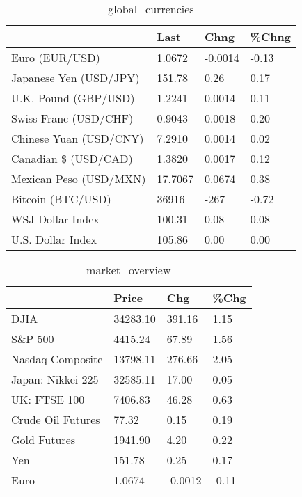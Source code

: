\documentclass{article}%
\begin{document}
%


\begin{table}[htbp]%
\caption{global\_currencies}%
\centering%
\begin{adjustbox}{width=1\textwidth}%
\begin{tabular}{llll}
\toprule
                       &    Last &    Chng & \%Chng \\
\midrule
        Euro (EUR/USD) &  1.0672 & -0.0014 & -0.13 \\
Japanese Yen (USD/JPY) &  151.78 &    0.26 &  0.17 \\
  U.K. Pound (GBP/USD) &  1.2241 &  0.0014 &  0.11 \\
 Swiss Franc (USD/CHF) &  0.9043 &  0.0018 &  0.20 \\
Chinese Yuan (USD/CNY) &  7.2910 &  0.0014 &  0.02 \\
  Canadian \$ (USD/CAD) &  1.3820 &  0.0017 &  0.12 \\
Mexican Peso (USD/MXN) & 17.7067 &  0.0674 &  0.38 \\
     Bitcoin (BTC/USD) &   36916 &    -267 & -0.72 \\
      WSJ Dollar Index &  100.31 &    0.08 &  0.08 \\
     U.S. Dollar Index &  105.86 &    0.00 &  0.00 \\
\bottomrule
\end{tabular}
%
\end{adjustbox}%
\end{table}

%


\begin{table}[htbp]%
\caption{market\_overview}%
\centering%
\begin{adjustbox}{width=1\textwidth}%
\begin{tabular}{llll}
\toprule
                  &    Price &     Chg &  \%Chg \\
\midrule
             DJIA & 34283.10 &  391.16 &  1.15 \\
          S\&P 500 &  4415.24 &   67.89 &  1.56 \\
 Nasdaq Composite & 13798.11 &  276.66 &  2.05 \\
Japan: Nikkei 225 & 32585.11 &   17.00 &  0.05 \\
     UK: FTSE 100 &  7406.83 &   46.28 &  0.63 \\
Crude Oil Futures &    77.32 &    0.15 &  0.19 \\
     Gold Futures &  1941.90 &    4.20 &  0.22 \\
              Yen &   151.78 &    0.25 &  0.17 \\
             Euro &   1.0674 & -0.0012 & -0.11 \\
\bottomrule
\end{tabular}
%
\end{adjustbox}%
\end{table}

%
\end{document}
